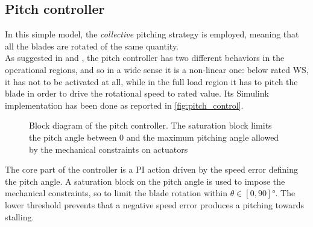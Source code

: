 \subsection{Pitch controller}
In this simple model, the \textit{collective} pitching strategy is employed, meaning that all the blades are rotated of the same quantity.\\
As suggested in \cite{Aerodynamics_of_wind_turbines} and \cite{SMILDEN2016386}, the pitch controller has two different behaviors in the operational regions, and so in a wide sense it is a non-linear one: below rated \acrshort{WS}, it has not to be activated at all, while in the full load region it has to pitch the blade in order to drive the rotational speed to rated value. Its Simulink implementation has been done as reported in \autoref{fig:pitch_control}.
\begin{figure}[H]
    \centering
    
    \caption{Block diagram of the pitch controller. The saturation block limits the pitch angle between 0 and the maximum pitching angle allowed by the mechanical constraints on actuators}
    \label{fig:pitch_control}
\end{figure}

The core part of the controller is a \acrfull{PI} action driven by the speed error defining the pitch angle. A saturation block on the pitch angle is used to impose the mechanical constraints, so to limit the blade rotation within $\theta \in \left[0, 90\right] \si{\degree}$. The lower threshold prevents that a negative speed error produces a pitching towards stalling.

